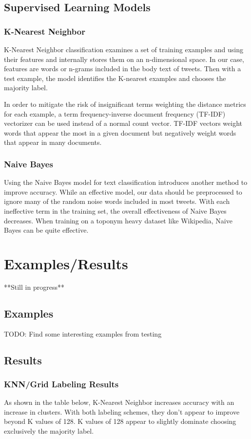 \documentclass[midd]{thesis}
\begin{document}
\section{Supervised Learning Models}
\subsection{K-Nearest Neighbor}

K-Nearest Neighbor classification examines a set of training examples and using their features and internally stores them on an n-dimensional space. In our case, features are words or n-grams included in the body text of tweets. Then with a test example, the model identifies the K-nearest examples and chooses the majority label.

In order to mitigate the risk of insignificant terms weighting the distance metrics for each example, a term frequency-inverse document frequency (TF-IDF) vectorizer can be used instead of a  normal count vector. TF-IDF vectors weight words that appear the most in a given document but negatively weight words that appear in many documents.


\subsection{Naive Bayes}

Using the Naive Bayes model for text classification introduces another method to improve accuracy. While an effective model, our data should be preprocessed to ignore many of the random noise words included in most tweets. With each ineffective term in the training set, the overall effectiveness of Naive Bayes decreases. When training on a toponym heavy dataset like Wikipedia, Naive Bayes can be quite effective.




\chapter{Examples/Results}
**Still in progress**
\section{Examples}
TODO: Find some interesting examples from testing

\section{Results}
\subsection{KNN/Grid Labeling Results}
As shown in the table below, K-Nearest Neighbor increases accuracy with an increase in clusters. With both labeling schemes, they don't appear to improve beyond K values of 128. K values of 128 appear to slightly dominate choosing exclusively the majority label.
\end{document}

